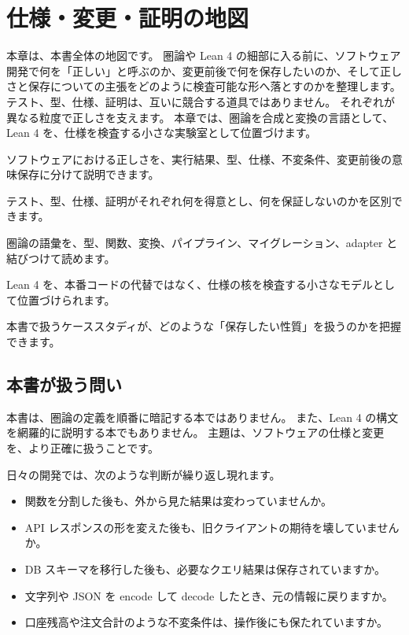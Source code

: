 \setcounter{chapter}{-1}
\chapter{仕様・変更・証明の地図}
\label{chap:ch00_map}

\begin{chapterabstract}
本章は、本書全体の地図です。
圏論や Lean 4 の細部に入る前に、ソフトウェア開発で何を「正しい」と呼ぶのか、変更前後で何を保存したいのか、そして正しさと保存についての主張をどのように検査可能な形へ落とすのかを整理します。
テスト、型、仕様、証明は、互いに競合する道具ではありません。
それぞれが異なる粒度で正しさを支えます。
本章では、圏論を合成と変換の言語として、Lean 4 を、仕様を検査する小さな実験室として位置づけます。
\end{chapterabstract}

\begin{learninggoals}
\item ソフトウェアにおける正しさを、実行結果、型、仕様、不変条件、変更前後の意味保存に分けて説明できます。
\item テスト、型、仕様、証明がそれぞれ何を得意とし、何を保証しないのかを区別できます。
\item 圏論の語彙を、型、関数、変換、パイプライン、マイグレーション、adapter と結びつけて読めます。
\item Lean 4 を、本番コードの代替ではなく、仕様の核を検査する小さなモデルとして位置づけられます。
\item 本書で扱うケーススタディが、どのような「保存したい性質」を扱うのかを把握できます。
\end{learninggoals}

\section{本書が扱う問い}

本書は、圏論の定義を順番に暗記する本ではありません。
また、Lean 4 の構文を網羅的に説明する本でもありません。
主題は、ソフトウェアの仕様と変更を、より正確に扱うことです。

日々の開発では、次のような判断が繰り返し現れます。

\begin{itemize}
\item 関数を分割した後も、外から見た結果は変わっていませんか。
\item API レスポンスの形を変えた後も、旧クライアントの期待を壊していませんか。
\item DB スキーマを移行した後も、必要なクエリ結果は保存されていますか。
\item 文字列や JSON を encode して decode したとき、元の情報に戻りますか。
\item 口座残高や注文合計のような不変条件は、操作後にも保たれていますか。
\end{itemize}

